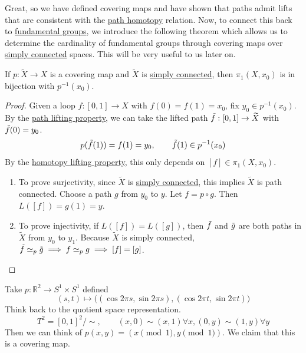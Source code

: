   Great, so we have defined covering maps and have shown that paths admit lifts that are consistent with the \hyperref[def:path-homotopy]{path homotopy} relation. Now, to connect this back to \hyperref[def:fundamental-group]{fundamental groups}, we introduce the following theorem which allows us to determine the cardinality of fundamental groups through covering maps over \hyperref[def:simply-connected]{simply connected} spaces. This will be very useful to us later on.  

  \begin{theorem}
    \label{thm:bijection-from-fundamental-group-to-preimage-of}
    If $p: \widetilde{X} \to X$ is a covering map and $\widetilde{X}$ is \hyperref[def:simply-connected]{simply connected}, then $\pi_1 (X, x_0)$ is in bijection with $p^{-1}(x_0)$.
  \end{theorem} 
  \begin{proof}
    Given a loop $f: [0, 1] \to X$ with $f(0) = f(1) = x_0$, fix $y_0 \in p^{-1} (x_0)$. By the \hyperref[thm:path-lifting-property]{path lifting property}, we can take the lifted path $\Tilde{f}: [0, 1] \to \widetilde{X}$ with $\Tilde{f}(0) = y_0$.
    \begin{equation}
      p(\Tilde{f}(1)) = f(1) = y_0, \qquad \Tilde{f}(1) \in p^{-1} (x_0)
    \end{equation}
    By the \hyperref[thm:homotopy-lifting-property]{homotopy lifting property}, this only depends on $[f] \in \pi_1 (X, x_0)$. 
    \begin{enumerate}
      \item To prove surjectivity, since $\widetilde{X}$ is \hyperref[def:simply-connected]{simply connected}, this implies $\widetilde{X}$ is path connected. Choose a path $g$ from $y_0$ to $y$. Let $f = p \circ g$. Then $L([f]) = g(1) = y$.

      \item To prove injectivity, if $L ([f]) = L([g])$, then $\Tilde{f}$ and $\Tilde{g}$ are both paths in $\widetilde{X}$ from $y_0$ to $y_1$. Because $\widetilde{X}$ is simply connected, $\Tilde{f} \simeq_p \Tilde{g} \implies f \simeq_p g \implies [f] = [g]$.
    \end{enumerate}
  \end{proof}

  \begin{example}
    \label{ex:the-universal-cover-of-the-torus}
    Take $p: \mathbb{R}^2 \to S^1 \times S^1$ defined 
    \begin{equation}
      (s, t) \mapsto \big( (\cos{2 \pi s}, \sin{2 \pi s}), (\cos{2 \pi t}, \sin{2 \pi t}) \big)
    \end{equation}
    Think back to the quotient space representation. 
    \begin{equation}
      T^2 = [0, 1]^2 /{\sim}, \qquad (x, 0) \sim (x, 1) \forall x, (0, y) \sim (1, y) \forall y
    \end{equation}
    Then we can think of $p(x, y) = (x \pmod{1}, y \pmod{1})$. We claim that this is a covering map. 
  \end{example}

